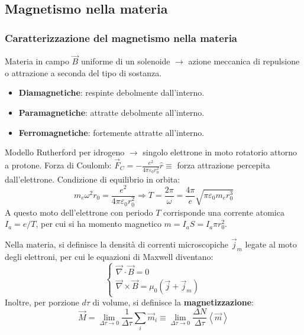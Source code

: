 \documentclass[10pt, a4paper]{scrartcl}
\numberwithin{equation}{subsection}
\theoremstyle{style1}
\begin{document}
\subsection{Magnetismo nella materia}

\subsubsection{Caratterizzazione del magnetismo nella materia}

Materia in campo $\vec{B}$ uniforme di un solenoide $\to$ azione meccanica di repulsione o attrazione a seconda del tipo di sostanza.
\begin{itemize}
	\item \textbf{Diamagnetiche}: respinte debolmente dall'interno.
	\item \textbf{Paramagnetiche}: attratte debolmente all'interno.
	\item \textbf{Ferromagnetiche}: fortemente attratte all'interno.
\end{itemize}
Modello Rutherford per idrogeno $\to$ singolo elettrone in moto rotatorio attorno a protone. Forza di Coulomb: $\vec{F}_C = -\frac{e^2}{4\pi \varepsilon _0 r_0^2}\hat{r}\equiv$ forza attrazione percepita dall'elettrone. Condizione di equilibrio in orbita:
\[
m_e \omega^2 r_0 = \frac{e^2}{4\pi \varepsilon _0 r_0^2} \Rightarrow T = \frac{2\pi}{\omega}=\frac{4\pi}{e}\sqrt{\pi \varepsilon _0 m_e r_0^3} 
\] 
A questo moto dell'elettrone con periodo $T$ corrisponde una corrente atomica $I_a = e / T$, per cui si ha momento magnetico $m = I_a S = I_a \pi r_0^2$.

Nella materia, si definisce la densit\`a di correnti microscopiche $\vec{j}_m$ legate al moto degli elettroni, per cui le equazioni di Maxwell diventano:
\begin{equation}
	\begin{cases}
		\vec{\nabla }\cdot \vec{B}=0\\
		\vec{\nabla }\times \vec{B} = \mu_0 (\vec{j}+\vec{j}_m)
	\end{cases}
\end{equation}
Inoltre, per porzione $d\tau $ di volume, si definisce la \textbf{magnetizzazione}:
\begin{equation}
	\vec{M} = \lim_{\Delta \tau  \to 0} \frac{1}{\Delta \tau }\sum_{i}^{} \vec{m}_i \equiv \lim_{\Delta \tau  \to 0} \frac{\Delta N}{\Delta \tau }\left\langle \vec{m} \right\rangle
\end{equation}
\end{document}
